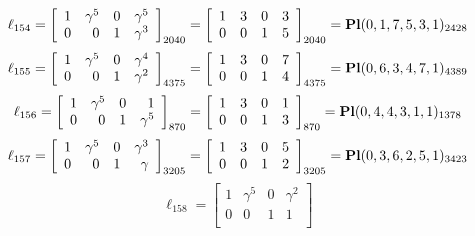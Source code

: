 \documentclass{article}
\begin{document}
{$$
\ell_{154} = 
\left[
\begin{array}{*{4}{r}}
1 & \gamma^{5} & 0 & \gamma^{5}\\
0 & 0 & 1 & \gamma^{3}\\
\end{array}
\right]
_{2040}
=
\left[
\begin{array}{*{4}c}
1  & 3  & 0  & 3\\
0  & 0  & 1  & 5\\
\end{array}
\right]_{2040}
={\rm\bf Pl}(0,1,7,5,3,1 )_{2428}$$
$$
\ell_{155} = 
\left[
\begin{array}{*{4}{r}}
1 & \gamma^{5} & 0 & \gamma^{4}\\
0 & 0 & 1 & \gamma^{2}\\
\end{array}
\right]
_{4375}
=
\left[
\begin{array}{*{4}c}
1  & 3  & 0  & 7\\
0  & 0  & 1  & 4\\
\end{array}
\right]_{4375}
={\rm\bf Pl}(0,6,3,4,7,1 )_{4389}$$
$$
\ell_{156} = 
\left[
\begin{array}{*{4}{r}}
1 & \gamma^{5} & 0 & 1\\
0 & 0 & 1 & \gamma^{5}\\
\end{array}
\right]
_{870}
=
\left[
\begin{array}{*{4}c}
1  & 3  & 0  & 1\\
0  & 0  & 1  & 3\\
\end{array}
\right]_{870}
={\rm\bf Pl}(0,4,4,3,1,1 )_{1378}$$
$$
\ell_{157} = 
\left[
\begin{array}{*{4}{r}}
1 & \gamma^{5} & 0 & \gamma^{3}\\
0 & 0 & 1 & \gamma \\
\end{array}
\right]
_{3205}
=
\left[
\begin{array}{*{4}c}
1  & 3  & 0  & 5\\
0  & 0  & 1  & 2\\
\end{array}
\right]_{3205}
={\rm\bf Pl}(0,3,6,2,5,1 )_{3423}$$
$$
\ell_{158} = 
\left[
\begin{array}{*{4}{r}}
1 & \gamma^{5} & 0 & \gamma^{2}\\
0 & 0 & 1 & 1\\
\end{array}
\right]
$$}
\end{document}
